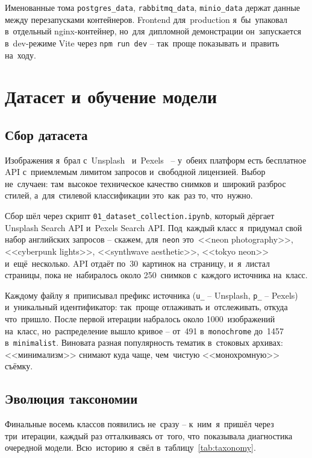 \documentclass[a4paper,12pt]{diplom}
\begin{document}
Именованные тома \texttt{postgres\_data}, \texttt{rabbitmq\_data}, \texttt{minio\_data} держат данные между перезапусками контейнеров. Frontend для~production я~бы~упаковал в~отдельный nginx-контейнер, но~для~дипломной демонстрации он~запускается в~dev-режиме Vite через \verb|npm run dev| -- так~проще показывать и~править на~ходу.

\chapter{Датасет и обучение модели}
\label{ch:dataset}

\section{Сбор датасета}
\label{sec:collection}

Изображения я~брал с~Unsplash~\cite{UnsplashAPI} и~Pexels~\cite{PexelsAPI} -- у~обеих платформ есть бесплатное API с~приемлемым лимитом запросов и~свободной лицензией. Выбор не~случаен: там~высокое техническое качество снимков и~широкий разброс стилей, а~для~стилевой классификации это~как~раз то, что~нужно.

Сбор шёл через скрипт \verb|01_dataset_collection.ipynb|, который дёргает Unsplash Search API и~Pexels Search API. Под~каждый класс я~придумал свой набор английских запросов -- скажем, для~\texttt{neon} это~<<neon photography>>, <<cyberpunk lights>>, <<synthwave aesthetic>>, <<tokyo neon>> и~ещё~несколько. API отдаёт по~30~картинок на~страницу, и~я~листал страницы, пока не~набиралось около 250~снимков с~каждого источника на~класс.

Каждому файлу я~приписывал префикс источника (\verb|u_| -- Unsplash, \verb|p_| -- Pexels) и~уникальный идентификатор: так~проще отлаживать и~отслеживать, откуда что~пришло. После первой итерации набралось около 1000~изображений на~класс, но~распределение вышло кривое -- от~491 в~\texttt{monochrome} до~1457 в~\texttt{minimalist}. Виновата разная популярность тематик в~стоковых архивах: <<минимализм>> снимают куда чаще, чем~чистую <<монохромную>> съёмку.

\section{Эволюция таксономии}
\label{sec:taxonomy}

Финальные восемь классов появились не~сразу -- к~ним~я~пришёл через три~итерации, каждый раз отталкиваясь от~того, что~показывала диагностика очередной модели. Всю~историю я~свёл в~таблицу~\ref{tab:taxonomy}.
\end{document}
